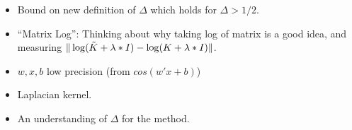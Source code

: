 \begin{itemize}
	\item Bound on new definition of $\Delta$ which holds for $\Delta > 1/2$.
	\item ``Matrix Log'': Thinking about why taking log of matrix is a good idea, and measuring $\|\log(\tilde{K} + \lambda * I) - \log(K + \lambda * I)\|$.
	\item $w,x,b$ low precision (from $cos(w'x + b)$)
	\item Laplacian kernel.
	\item An understanding of $\Delta$ for the \Nystrom method.
\end{itemize}